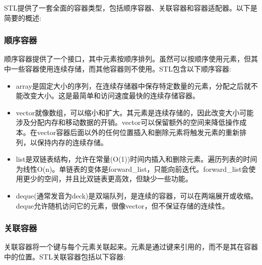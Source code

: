 
STL提供了一套全面的容器类型，包括顺序容器、关联容器和容器适配器。以下是简要的概述:

\subsubsection{顺序容器}

顺序容器提供了一个接口，其中元素按顺序排列。虽然可以按顺序使用元素，但其中一些容器使用连续存储，而其他容器则不使用。STL包含以下顺序容器:

\begin{itemize}
\item 
array是固定大小的序列，在连续存储器中保存特定数量的元素，分配之后就不能改变大小。这是最简单和访问速度最快的连续存储容器。

\item 
vector就像数组，可以缩小和扩大。其元素是连续存储的，因此改变大小可能涉及分配内存和移动数据的开销。vector可以保留额外的空间来降低操作成本。在vector容器后面以外的任何位置插入和删除元素将触发元素的重新排列，以保持内存的连续存储。

\item 
list是双链表结构，允许在常量(O(1))时间内插入和删除元素。遍历列表的时间为线性O(n)。单链表的变体是forward\_list，只能向前迭代。forward\_list会使用更少的空间，并且比双链表更高效，但缺少一些功能。

\item 
deque(通常发音为deck)是双端队列，是连续的容器，可以在两端展开或收缩。deque允许随机访问它的元素，很像vector，但不保证存储的连续性。
\end{itemize}

\subsubsection{关联容器}

关联容器将一个键与每个元素关联起来。元素是通过键来引用的，而不是其在容器中的位置。STL关联容器包括以下容器:

